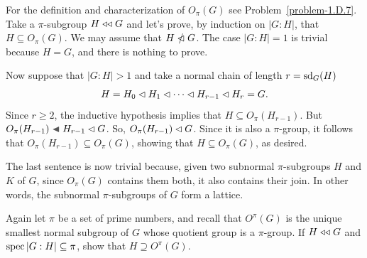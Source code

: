 \begin{solution}  For the definition and characterization of $O_\pi(G)$ see Problem~\ref{problem-1.D.7}. Take a $\pi$-subgroup $H\mathrel{\triangleleft\triangleleft} G$ and let's prove, by induction on $|G:H|$, that $H\subseteq O_\pi(G)$. We may assume that $H\nnormal G$. The case $|G:H|=1$ is trivial because $H=G$, and there is nothing to prove.

Now suppose that $|G:H|>1$ and take a normal chain of length $r={\rm sd}_G(H)$
$$
    H = H_0\lhd H_1\lhd\cdots\lhd H_{r-1}\lhd H_r=G.
$$
Since $r\ge2$, the inductive hypothesis implies that $H\subseteq O_\pi(H_{r-1})$. But $O_\pi(H_{r-1})\ch H_{r-1}\normal G$. So, $O_\pi(H_{r-1})\lhd G$. Since it is also a $\pi$-group, it follows that $O_\pi(H_{r-1})\subseteq O_\pi(G)$, showing that $H\subseteq O_\pi(G)$, as desired.

The last sentence is now trivial because, given two subnormal $\pi$-subgroups $H$ and $K$ of $G$, since $O_\pi(G)$ contains them both, it also contains their join. In other words, the subnormal $\pi$-subgroups of $G$ form a lattice.  \end{solution}

\begin{probl}\label{problem-2.A.2}
    Again let $\pi$ be a set of prime numbers, and recall that $O^\pi(G)$ is the unique smallest normal subgroup of\/ $G$ whose quotient group is a $\pi$-group. If\/ $H\mathrel{\triangleleft\triangleleft} G$ and $\operatorname{spec}|G:H|\subseteq\pi$, show that $H\supseteq O^\pi(G)$.
\end{probl}


